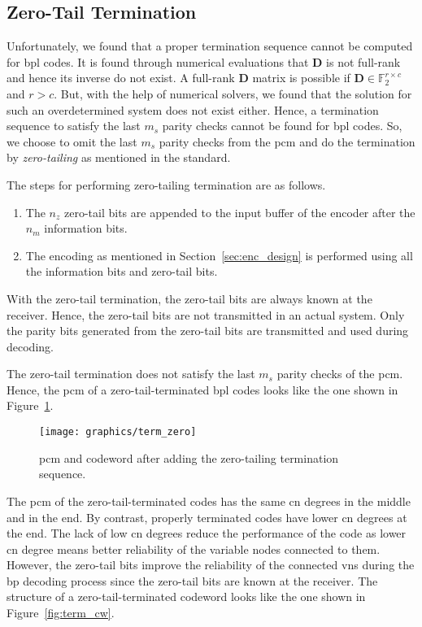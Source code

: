 \subsection{Zero-Tail Termination}
Unfortunately, we found that a proper termination sequence cannot be computed for \gls{bpl} codes. It is found through numerical evaluations that $\mathbf{D}$ is not full-rank and hence its inverse do not exist. A full-rank $\mathbf{D}$ matrix is possible if $\mathbf{D}\in\mathbb{F}_2^{r\times c}$ and $r>c$. But, with the help of numerical solvers, we found that the solution for such an overdetermined system does not exist either. Hence, a termination sequence to satisfy the last $m_s$ parity checks cannot be found for \gls{bpl} codes. So, we choose to omit the last $m_s$ parity checks from the \gls{pcm} and do the termination by \emph{zero-tailing} as mentioned in the standard.

The steps for performing zero-tailing termination are as follows.
\begin{enumerate}
  \item The $n_z$ zero-tail bits are appended to the input buffer of the encoder after the $n_m$ information bits.
  \item The encoding as mentioned in Section~\ref{sec:enc_design} is performed using all the information bits and zero-tail bits.
\end{enumerate}
With the zero-tail termination, the zero-tail bits are always known at the receiver. Hence, the zero-tail bits are not transmitted in an actual system. Only the parity bits generated from the zero-tail bits are transmitted and used during decoding.

The zero-tail termination does not satisfy the last $m_s$ parity checks of the \gls{pcm}. Hence, the \gls{pcm} of a zero-tail-terminated \gls{bpl} codes looks like the one shown in Figure~\ref{fig:pcm_zero}.
\begin{figure}[htbp]
  \centering
  \texttt{[image: graphics/term\_zero]}
  \caption[Illustration of zero-tail termination.]{\gls{pcm} and codeword after adding the zero-tailing termination sequence.}
  \label{fig:pcm_zero}
\end{figure}

The \gls{pcm} of the zero-tail-terminated codes has the same \gls{cn} degrees in the middle and in the end. By contrast, properly terminated codes have lower \gls{cn} degrees at the end. The lack of low \gls{cn} degrees reduce the performance of the code as lower \gls{cn} degree means better reliability of the variable nodes connected to them. However, the zero-tail bits improve the reliability of the connected \glspl{vn} during the \gls{bp} decoding process since the zero-tail bits are known at the receiver. The structure of a zero-tail-terminated codeword looks like the one shown in Figure~\ref{fig:term_cw}.


